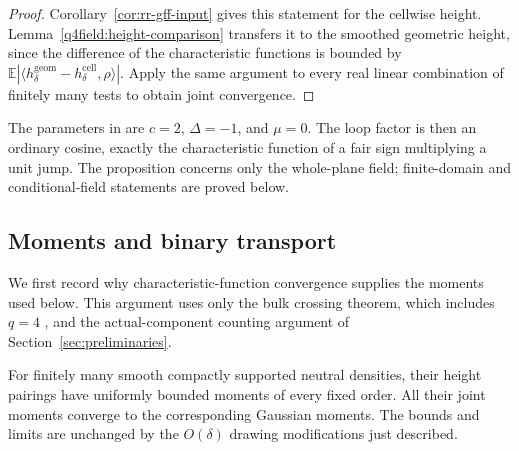 \begin{proof}
Corollary~\ref{cor:rr-gff-input} gives this statement for the cellwise
height.  Lemma~\ref{q4field:height-comparison} transfers it to the
smoothed geometric height, since the difference of the characteristic
functions is bounded by
$\mathbb E|\langle h_\delta^{\mathrm{geom}}
-h_\delta^{\mathrm{cell}},\rho\rangle|$.  Apply the same argument
to every real linear combination of finitely many tests to obtain
joint convergence.
\end{proof}

The parameters in \citet[Theorem~2.8 and Corollary~3.2]{SixVertexGFF2026}
are $c=2$, $\Delta=-1$, and $\mu=0$.  The loop factor is then an
ordinary cosine, exactly the characteristic function of a fair sign
multiplying a unit jump.  The proposition concerns only the
whole-plane field; finite-domain and conditional-field statements
are proved below.

\subsection{Moments and binary transport}

We first record why characteristic-function convergence supplies the
moments used below.  This argument uses only the bulk crossing theorem,
which includes $q=4$ \citep{DCLM2019Isoradial}, and the actual-component
counting argument of Section~\ref{sec:preliminaries}.

\begin{lemma}\label{q4field:neutral-moments}
For finitely many smooth compactly supported neutral densities, their
height pairings have uniformly bounded moments of every fixed order.
All their joint moments converge to the corresponding Gaussian
moments.  The bounds and limits
are unchanged by the $O(\delta)$ drawing modifications just described.
\end{lemma}

